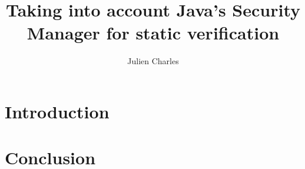 \documentclass[draft]{llncs}
\begin{document}
\newcommand{\rarrow}{$\rightarrow$}
\newcommand{\conj}{$\wedge$}
\newcommand{\disjonc}{$\vee$}
\newcommand{\s}{\,}
\newcommand{\btab}{\begin{tt}\begin{tabbing}}
\newcommand{\etab}{\end{tabbing}\end{tt}}
\newcommand{\bcode}{\begin{tt}\begin{small}\begin{tabbing}}
\newcommand{\ecode}{\end{tabbing}\end{small}\end{tt}}
%
\frontmatter %
%

\mainmatter %
%
\title{Taking into account Java's Security Manager for static
verification}
%
%
\author{Julien Charles}
%
%
%

\maketitle %

\begin{abstract}

\end{abstract}
%
\section{Introduction}









%



\section{Conclusion}
\label{conclusion}




%
%




%
\end{document}
